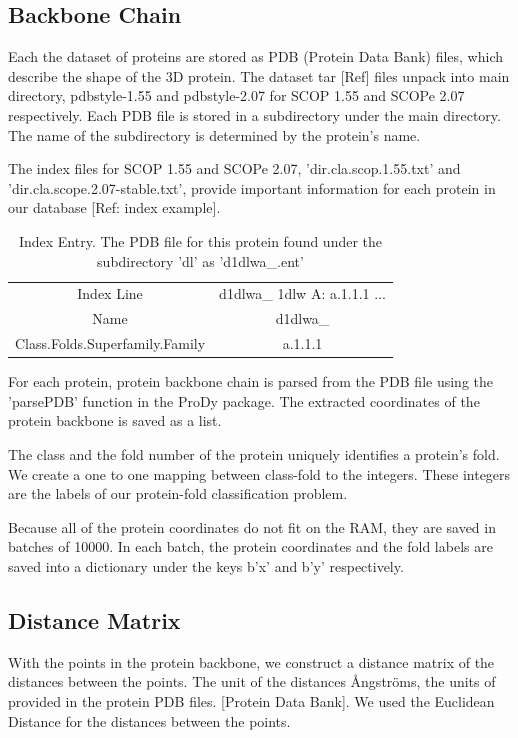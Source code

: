 \documentclass[12pt, a4paper, twocolumn, fullpage]{article}
\theoremstyle{plain}
\theoremstyle{definition}
\theoremstyle{remark}
\begin{document}
\subsection{ Backbone Chain}
Each the dataset of proteins are stored as PDB (Protein Data Bank) files, which describe the shape of the 3D protein. The dataset tar [Ref] files unpack into main directory, pdbstyle-1.55 and pdbstyle-2.07 for SCOP 1.55 and SCOPe 2.07 respectively. Each PDB file is stored in a subdirectory under the main directory. The name of the subdirectory is determined by the protein's name.

The index files for SCOP 1.55 and SCOPe 2.07, 'dir.cla.scop.1.55.txt' and 'dir.cla.scope.2.07-stable.txt', provide important information for each protein in our database [Ref: index example]. 

\begin{table}[t]
	\centering
	\begin{tabular}{c | c}
		Index Line & d1dlwa\_ 1dlw    A:  a.1.1.1 ... \\
		Name & d1dlwa\_     \\
		Class.Folds.Superfamily.Family & a.1.1.1    \\
	\end{tabular}
	\caption{Index Entry. The PDB file for this protein found under the subdirectory 'dl' as 'd1dlwa\_.ent'}
	\label{tbl:Index Entry}
\end{table}

For each protein, protein backbone chain is parsed from the PDB file using the 'parsePDB' function in the ProDy package. The extracted coordinates of the protein backbone is saved as a list. 

The class and the fold number of the protein uniquely identifies a protein's fold. We create a one to one mapping between class-fold to the integers. These integers are the labels of our protein-fold classification problem.

Because all of the protein coordinates do not fit on the RAM, they are saved in batches of 10000. In each batch, the protein coordinates and the fold labels are saved into a dictionary under the keys b'x' and b'y' respectively.

\subsection{ Distance Matrix}
With the points in the protein backbone, we construct a distance matrix of the distances between the points. The unit of the distances Ångströms, the units of provided in the protein PDB files. [Protein Data Bank]. We used the Euclidean Distance for the distances between the points.
\end{document}
